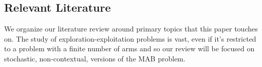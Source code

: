 



\subsection{Relevant Literature}
We organize our literature review around primary topics that this paper touches on. The study of exploration-exploitation problems is vast, even if it's restricted to a problem with a finite number of arms and so our review will be focused on stochastic, non-contextual, versions of the MAB problem.

